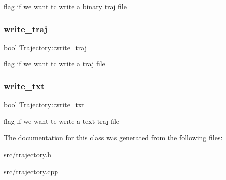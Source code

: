 flag if we want to write a binary traj file \mbox{\label{class_trajectory_a1194477068ed051401f99aba4a1056b1}} 
\subsubsection{\texorpdfstring{write\+\_\+traj}{write\_traj}}
{\footnotesize\ttfamily bool Trajectory\+::write\+\_\+traj}

flag if we want to write a traj file \mbox{\label{class_trajectory_a94125474ee64fd3007091a3e88f59769}} 
\subsubsection{\texorpdfstring{write\+\_\+txt}{write\_txt}}
{\footnotesize\ttfamily bool Trajectory\+::write\+\_\+txt}

flag if we want to write a text traj file 

The documentation for this class was generated from the following files\+:\begin{DoxyCompactItemize}
\item 
src/trajectory.\+h\item 
src/trajectory.\+cpp\end{DoxyCompactItemize}
